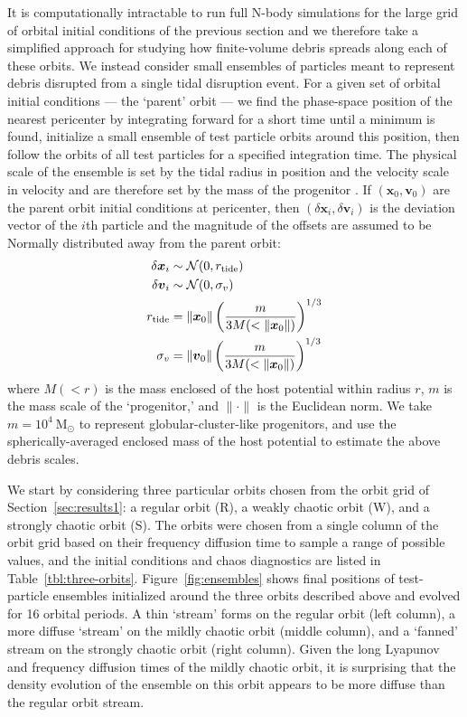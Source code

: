 \documentclass[letterpaper,12pt,preprint]{aastex}
\newcommand{\msun}{\ensuremath{\mathrm{M}_\odot}}
\newcommand{\bs}[1]{\boldsymbol{#1}}
\begin{document}
It is computationally intractable to run full N-body simulations for the large grid of orbital initial conditions of the previous section and we therefore take a simplified approach for studying how finite-volume debris spreads along each of these orbits. We instead consider small ensembles of particles meant to represent debris disrupted from a single tidal disruption event. For a given set of orbital initial conditions --- the `parent' orbit --- we find the phase-space position of the nearest pericenter by integrating forward for a short time until a minimum is found, initialize a small ensemble of test particle orbits around this position, then follow the orbits of all test particles for a specified integration time. The physical scale of the ensemble is set by the tidal radius in position and the velocity scale in velocity and are therefore set by the mass of the progenitor \citep[e.g.,][]{johnston98, apw14}. If $(\bs{x}_0,\bs{v}_0)$ are the parent orbit initial conditions at pericenter, then $(\delta\bs{x}_i,\delta\bs{v}_i)$ is the deviation vector of the $i$th particle and the magnitude of the offsets are assumed to be Normally distributed away from the parent orbit:
\begin{align}
	\delta\bs{x}_i &\sim \mathcal{N}(0, r_{\rm tide})\\
	\delta\bs{v}_i &\sim \mathcal{N}(0, \sigma_v)\\
	r_{\rm tide} &= \|\bs{x}_0\| \left(\frac{m}{3M(<\|\bs{x}_0\|)}\right)^{1/3} \\
	\sigma_v &= \|\bs{v}_0\|\left(\frac{m}{3M(<\|\bs{x}_0\|)}\right)^{1/3} 
\end{align}
where $M(<r)$ is the mass enclosed of the host potential within radius $r$, $m$ is the mass scale of the `progenitor,' and $\|\cdot \|$ is the Euclidean norm. We take $m=10^4~\msun$ to represent globular-cluster-like progenitors, and use the spherically-averaged enclosed mass of the host potential to estimate the above debris scales. 

We start by considering three particular orbits chosen from the orbit grid of Section~\ref{sec:results1}: a regular orbit (R), a weakly chaotic orbit (W), and a strongly chaotic orbit (S). The orbits were chosen from a single column of the orbit grid based on their frequency diffusion time to sample a range of possible values, and the initial conditions and chaos diagnostics are listed in Table~\ref{tbl:three-orbits}. Figure~\ref{fig:ensembles} shows final positions of test-particle ensembles initialized around the three orbits described above and evolved for 16 orbital periods. A thin `stream' forms on the regular orbit (left column), a more diffuse `stream' on the mildly chaotic orbit (middle column), and a `fanned' stream on the strongly chaotic orbit (right column). Given the long Lyapunov and frequency diffusion times of the mildly chaotic orbit, it is surprising that the density evolution of the ensemble on this orbit appears to be more diffuse than the regular orbit stream. 
\end{document}
